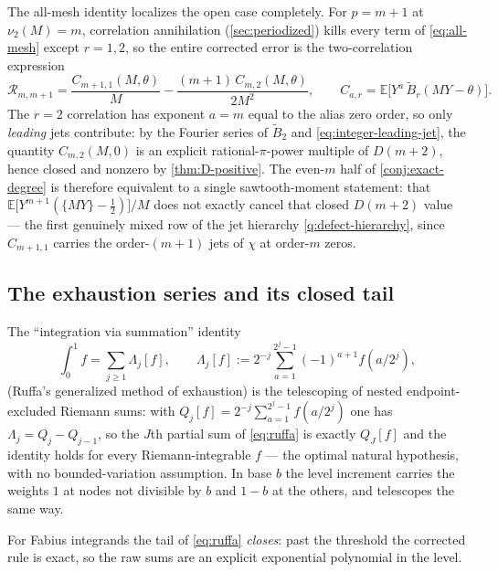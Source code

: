 \documentclass[11pt,oneside]{article}
\numberwithin{equation}{section}
\theoremstyle{definition}
\theoremstyle{remark}
\newcommand{\E}{\mathbb E}
\newcommand{\vtwo}{\nu_2}
\newcommand{\defect}{\mathcal R}
\begin{document}
\begin{remark}
\label{rem:even-m-reduction}
The all-mesh identity localizes the open case completely.  For
$p=m+1$ at $\vtwo(M)=m$, correlation annihilation
(\cref{sec:periodized}) kills every term of
\eqref{eq:all-mesh} except $r=1,2$, so the entire corrected error is
the two-correlation expression
\begin{equation}
 \defect_{m,m+1}
 =\frac{C_{m+1,1}(M,\theta)}{M}
 -\frac{(m+1)\,C_{m,2}(M,\theta)}{2M^{2}},
 \qquad
 C_{a,r}=\E\bigl[Y^{a}\,\widetilde B_r(MY-\theta)\bigr].
 \label{eq:even-m-two-terms}
\end{equation}
The $r=2$ correlation has exponent $a=m$ equal to the alias zero
order, so only \emph{leading} jets contribute: by the Fourier series
of $\widetilde B_2$ and \eqref{eq:integer-leading-jet}, the quantity
$C_{m,2}(M,0)$ is an explicit rational-$\pi$-power multiple of
$D(m+2)$, hence closed and nonzero by \cref{thm:D-positive}.  The
even-$m$ half of \cref{conj:exact-degree} is therefore equivalent to
a single sawtooth-moment statement: that
$\E\bigl[Y^{m+1}(\{MY\}-\tfrac12)\bigr]/M$ does not exactly cancel
that closed $D(m+2)$ value --- the first genuinely mixed row of the
jet hierarchy \cref{q:defect-hierarchy}, since $C_{m+1,1}$ carries
the order-$(m+1)$ jets of $\chi$ at order-$m$ zeros.
\end{remark}

\subsection{The exhaustion series and its closed tail}

The ``integration via summation'' identity
\begin{equation}
 \int_0^1f=\sum_{j\ge1}\Lambda_j[f],
 \qquad
 \Lambda_j[f]:=2^{-j}\sum_{a=1}^{2^{j}-1}(-1)^{a+1}f(a/2^{j}),
 \label{eq:ruffa}
\end{equation}
(Ruffa's generalized method of exhaustion) is the telescoping of
nested endpoint-excluded Riemann sums: with
$Q_j[f]=2^{-j}\sum_{a=1}^{2^{j}-1}f(a/2^{j})$ one has
$\Lambda_j=Q_j-Q_{j-1}$, so the $J$th partial sum of \eqref{eq:ruffa}
is exactly $Q_J[f]$ and the identity holds for every Riemann-integrable
$f$ --- the optimal natural hypothesis, with no bounded-variation
assumption.  In base $b$ the level increment carries the weights $1$ at
nodes not divisible by $b$ and $1-b$ at the others, and telescopes the
same way.

For Fabius integrands the tail of \eqref{eq:ruffa} \emph{closes}: past
the threshold the corrected rule is exact, so the raw sums are an
explicit exponential polynomial in the level.
\end{document}
